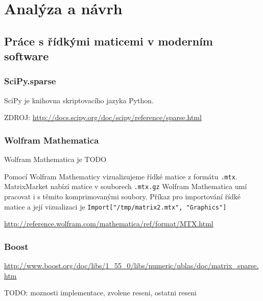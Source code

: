 \chapter{Analýza a návrh}

\section{Práce s řídkými maticemi v moderním software}

\subsection{SciPy.sparse}

SciPy je knihovna skriptovacího jazyka Python.

ZDROJ: \url{http://docs.scipy.org/doc/scipy/reference/sparse.html}


\subsection{Wolfram Mathematica}

Wolfram Mathematica je TODO

Pomocí Wolfram Mathematicy vizualizujeme řídké matice z formátu \texttt{.mtx}. MatrixMarket nabízí matice v souborech \texttt{.mtx.gz} Wolfram Mathematica umí pracovat i s těmito komprimovanými soubory. Příkaz pro importování řídké matice a její vizualizaci je \texttt{Import["/tmp/matrix2.mtx", "Graphics"]}

\url{http://reference.wolfram.com/mathematica/ref/format/MTX.html}


\subsection{Boost}

\url{http://www.boost.org/doc/libs/1_55_0/libs/numeric/ublas/doc/matrix_sparse.htm}


TODO: moznosti implementace, zvolene reseni, ostatni reseni
